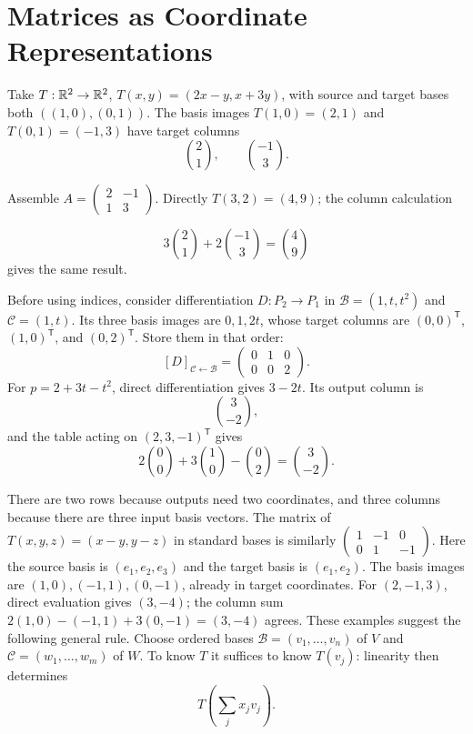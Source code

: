\section{Matrices as Coordinate Representations}
\begin{example}
Take $T:\mathbb{R}^2\to\mathbb{R}^2$, $T(x,y)=(2x-y,x+3y)$, with source and target
bases both $((1,0),(0,1))$. The basis images $T(1,0)=(2,1)$ and
$T(0,1)=(-1,3)$ have target columns
\[
\binom21,\qquad \binom{-1}3.
\]

Assemble $A=\left(\begin{matrix}2&-1\\1&3\end{matrix}\right)$.
Directly $T(3,2)=(4,9)$; the column calculation

\[
3\binom21+2\binom{-1}3=\binom49
\]
 gives the same result.
\end{example}
Before using indices, consider differentiation $D:P_2\to P_1$ in
$\mathcal B=(1,t,t^2)$ and $\mathcal C=(1,t)$. Its three basis images
are $0,1,2t$, whose target columns are $(0,0)^{\mathsf T}$,
$(1,0)^{\mathsf T}$, and $(0,2)^{\mathsf T}$. Store them in that order:
\[
[D]_{\mathcal C\leftarrow\mathcal B}=\begin{pmatrix}0&1&0\\0&0&2\end{pmatrix}.
\]
For $p=2+3t-t^2$, direct differentiation gives $3-2t$.
Its output column is
\[
\binom3{-2},
\]
 and the table acting on
$(2,3,-1)^{\mathsf T}$ gives
\[
2\binom00+3\binom10-\binom02=\binom3{-2}.
\]

There are two rows because outputs need two coordinates, and three columns
because there are three input basis vectors. The matrix of
$T(x,y,z)=(x-y,y-z)$ in standard bases is similarly
$\left(\begin{matrix}1&-1&0\\0&1&-1\end{matrix}\right)$.
Here the source basis is $(e_1,e_2,e_3)$ and the target basis is $(e_1,e_2)$.
The basis images are $(1,0),(-1,1),(0,-1)$, already in target coordinates.
For $(2,-1,3)$, direct evaluation gives $(3,-4)$; the column sum
$2(1,0)-(-1,1)+3(0,-1)=(3,-4)$ agrees. These examples suggest the following general rule.
Choose ordered bases $\mathcal B=(v_1,\ldots,v_n)$ of $V$ and
$\mathcal C=(w_1,\ldots,w_m)$ of $W$. To know $T$ it suffices to know
$T(v_j)$: linearity then determines
\[
T(\sum_j x_jv_j).
\]

